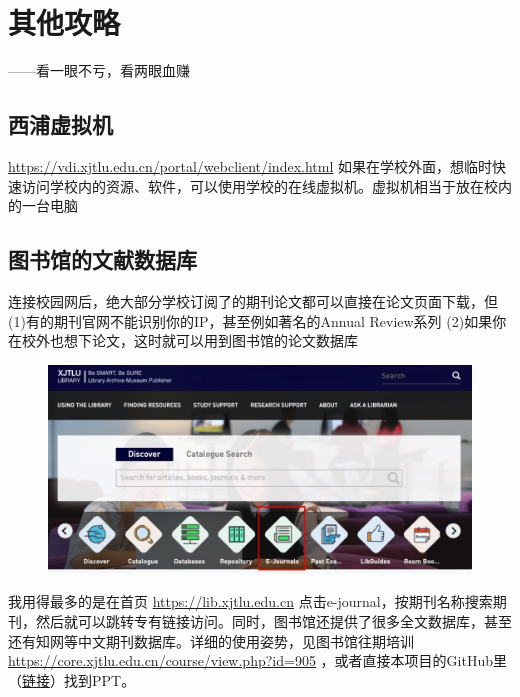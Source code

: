 
\chapter{其他攻略}

\begin{flushright}
    ——看一眼不亏，看两眼血赚
\end{flushright}

 \clearpage

 \clearpage

 \clearpage

\section{西浦虚拟机}
\url{https://vdi.xjtlu.edu.cn/portal/webclient/index.html}
如果在学校外面，想临时快速访问学校内的资源、软件，可以使用学校的在线虚拟机。虚拟机相当于放在校内的一台电脑

\section{图书馆的文献数据库}
连接校园网后，绝大部分学校订阅了的期刊论文都可以直接在论文页面下载，但(1)有的期刊官网不能识别你的IP，甚至例如著名的Annual Review系列 (2)如果你在校外也想下论文，这时就可以用到图书馆的论文数据库

\begin{figure}[H]
    \includegraphics[width=0.7\columnwidth, center]{author-folder/Kai.Wu/library-ejournal.jpg}
\end{figure}

我用得最多的是在首页 \url{https://lib.xjtlu.edu.cn} 点击e-journal，按期刊名称搜索期刊，然后就可以跳转专有链接访问。同时，图书馆还提供了很多全文数据库，甚至还有知网等中文期刊数据库。详细的使用姿势，见图书馆往期培训 \url{https://core.xjtlu.edu.cn/course/view.php?id=905} ，或者直接本项目的GitHub里（\href{https://github.com/kaiwu-astro/xp_pgrs_unofficial_guide/tree/main/fileshare}{链接}）找到PPT。

